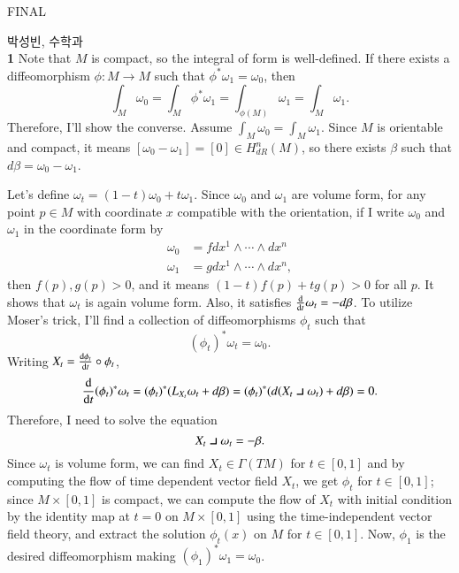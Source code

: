 \documentclass[a4paper, 12pt]{article}
\theoremstyle{Mydefinition}
\theoremstyle{Mytheorem}
\newcommand{\intprodl}{%
    \mathbin{\scalebox{1.5}{$\lrcorner$}}%
}
\begin{document}
\thispagestyle{myfirstpage}
\begin{center}
    \Large{FINAL}
\end{center}
박성빈, 수학과\\

\noindent \textbf{1}
Note that $M$ is compact, so the integral of form is well-defined. If there exists a diffeomorphism $\phi:M\rightarrow M$ such that $\phi^*\omega_1 = \omega_0$, then
\begin{equation*}
    \int_M \omega_0 = \int_M \phi^*\omega_1 = \int_{\phi(M)} \omega_1 = \int_{M} \omega_1.
\end{equation*}
Therefore, I'll show the converse. Assume $\int_M \omega_0=\int_M \omega_1$. Since $M$ is orientable and compact, it means $[\omega_0-\omega_1]=[0]\in H_{dR}^n(M)$, so there exists $\beta$ such that $d\beta = \omega_0-\omega_1$.

Let's define $\omega_t = (1-t)\omega_0+t\omega_1$. Since $\omega_0$ and $\omega_1$ are volume form, for any point $p\in M$ with coordinate $x$ compatible with the orientation, if I write $\omega_0$ and $\omega_1$ in the coordinate form by
\begin{equation*}
\begin{split}
    \omega_0 &= fdx^1\wedge\cdots \wedge dx^n\\
    \omega_1 &= gdx^1\wedge\cdots \wedge dx^n,
\end{split}
\end{equation*}
then $f(p),g(p)>0$, and it means $(1-t)f(p)+tg(p)>0$ for all $p$. It shows that $\omega_t$ is again volume form. Also, it satisfies $\dv{t}\omega_t = -d\beta$. To utilize Moser's trick, I'll find a collection of diffeomorphisms $\phi_t$ such that
\begin{equation*}
    (\phi_t)^*\omega_t = \omega_0.
\end{equation*}
Writing $X_t = \dv{\phi_t}{t}\circ \phi_t$,
\begin{equation*}
    \dv{t}(\phi_t)^*\omega_t = (\phi_t)^*(L_{X_t}\omega_t + d\beta) = (\phi_t)^*(d(X_t\intprodl \omega_t) + d\beta) = 0.
\end{equation*}
Therefore, I need to solve the equation
\begin{equation*}
    X_t\intprodl \omega_t = -\beta.
\end{equation*}
Since $\omega_t$ is volume form, we can find $X_t\in \Gamma(TM)$ for $t\in [0,1]$ and by computing the flow of time dependent vector field $X_t$, we get $\phi_t$ for $t\in[0,1]$; since $M\times [0,1]$ is compact, we can compute the flow of $X_t$ with initial condition by the identity map at $t=0$ on $M\times[0,1]$ using the time-independent vector field theory, and extract the solution $\phi_t(x)$ on $M$ for $t\in [0,1]$. Now, $\phi_1$ is the desired diffeomorphism making $(\phi_1)^*\omega_1 = \omega_0$.\\
\end{document}

